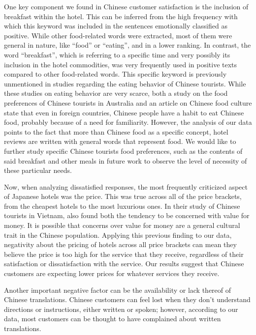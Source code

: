 \documentclass[review]{elsarticle}
\begin{document}
One key component we found in Chinese customer satisfaction is the inclusion of breakfast within the hotel. This can be inferred from the high frequency with which this keyword was included in the sentences emotionally classified as positive. While other food-related words were extracted, most of them were general in nature, like “food” or “eating”, and in a lower ranking. In contrast, the word “breakfast”, which is referring to a specific time and very possibly its inclusion in the hotel commodities, was very frequently used in positive texts compared to other food-related words. This specific keyword is previously unmentioned in studies regarding the eating behavior of Chinese tourists. While these studies on eating behavior are very scarce, both a study on the food preferences of Chinese tourists in Australia \cite[][]{chang2010} and an article on Chinese food culture \cite[][]{ma2015} state that even in foreign countries, Chinese people have a habit to eat Chinese food, probably because of a need for familiarity. However, the analysis of our data points to the fact that more than Chinese food as a specific concept, hotel reviews are written with general words that represent food. We would like to further study specific Chinese tourists food preferences, such as the contents of said breakfast and other meals in future work to observe the level of necessity of these particular needs.

Now, when analyzing dissatisfied responses, the most frequently criticized aspect of Japanese hotels was the price. This was true across all of the price brackets, from the cheapest hotels to the most luxurious ones. In their study of Chinese tourists in Vietnam, \cite{truong2009} also found both the tendency to be concerned with value for money. It is possible that concerns over value for money are a general cultural trait in the Chinese population. Applying this previous finding to our data, negativity about the pricing of hotels across all price brackets can mean they believe the price is too high for the service that they receive, regardless of their satisfaction or dissatisfaction with the service. Our results suggest that Chinese customers are expecting lower prices for whatever services they receive.  

Another important negative factor can be the availability or lack thereof of Chinese translations. Chinese customers can feel lost when they don't understand directions or instructions, either written or spoken; however, according to our data, most customers can be thought to have complained about written translations. 
\end{document}
